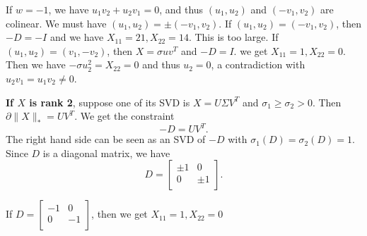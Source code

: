 If $w=-1$,
we have $u_1v_2+u_2v_1=0$,
and thus $(u_1,u_2)$ and $(-v_1,v_2)$ are colinear.
We must have $(u_1,u_2)=\pm(-v_1,v_2)$.
If $(u_1,u_2)=(-v_1,v_2)$,
then $-D=-I$ and we have $X_{11}=21, X_{22}=14$.
This is too large.
If $(u_1,u_2)=(v_1,-v_2)$,
then $X=\sigma uv^T$ and $-D=I$.
we get $X_{11}=1, X_{22}=0$.
Then we have $-\sigma u_2^2=X_{22}=0$
and thus $u_2=0$,
a contradiction with $u_2v_1=u_1v_2\ne0$.

\textbf{If $X$ is rank 2},
suppose one of its SVD is $X=U\Sigma V^T$
and $\sigma_1\ge\sigma_2>0$.
Then $\partial\|X\|_*=UV^T$.
We get the constraint
\begin{equation}
    -D=UV^T.
\end{equation}
The right hand side can be seen as an SVD of $-D$
with $\sigma_1(D)=\sigma_2(D)=1$.
Since $D$ is a diagonal matrix,
we have
\begin{equation}
    D=
    \begin{bmatrix}
        \pm1 & 0    \\
        0    & \pm1 \\
    \end{bmatrix}.
\end{equation}

If $D=
    \begin{bmatrix}
        -1 & 0    \\
        0    & -1 \\
    \end{bmatrix}$,
then we get $X_{11}=1, X_{22}=0$
